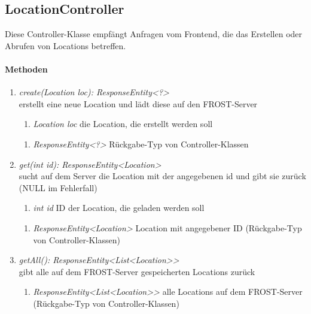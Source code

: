 \subsection*{LocationController}\label{locCon}
Diese Controller-Klasse empfängt Anfragen vom Frontend, die das Erstellen oder Abrufen von Locations betreffen.

\paragraph{Methoden}

\begin{enumerate}[+]
	\item \textit{ create(Location loc): ResponseEntity<?> }\\
	erstellt eine neue Location und lädt diese auf den FROST-Server
	
	\begin{enumerate}[$\bullet$]
		\item \textit{Location loc} die Location, die erstellt werden soll
		
	\end{enumerate}
	\vspace{-0.2cm}
	\begin{enumerate}[$\circ$]
		\item \textit{ResponseEntity<?>} Rückgabe-Typ von Controller-Klassen
	\end{enumerate}
	
	\item \textit{ get(int id): ResponseEntity<Location> }\\
	sucht auf dem Server die Location mit der angegebenen id und gibt sie zurück (NULL im Fehlerfall)
	
	\begin{enumerate}[$\bullet$]
		\item \textit{int id} ID der Location, die geladen werden soll
		
	\end{enumerate}
	\vspace{-0.2cm}
	\begin{enumerate}[$\circ$]
		\item \textit{ResponseEntity<Location>} Location mit angegebener ID (Rückgabe-Typ von Controller-Klassen)
	\end{enumerate}
	\item \textit{ getAll(): ResponseEntity<List<Location>> }\\
	gibt alle auf dem FROST-Server gespeicherten Locations zurück
	
	\begin{enumerate}[$\circ$]
		\item \textit{ResponseEntity<List<Location>>} alle Locations auf dem FROST-Server (Rückgabe-Typ von Controller-Klassen)
	\end{enumerate}
	
	
\end{enumerate}	